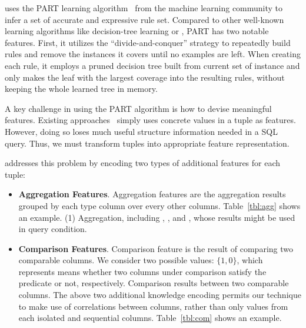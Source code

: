 \ourtool uses the PART learning algorithm~\cite{Frank:1998} from
the machine learning community to infer a set of accurate and
expressive rule set. Compared to other well-known learning algorithms
like decision-tree learning or , PART has two
notable features. 
First, it utilizes the ``divide-and-conquer'' strategy to repeatedly
build rules and remove the instances it covers until no examples are left.
When creating each rule, it employs a pruned decision tree built from
current set of instance and only makes the leaf with the largest coverage
into the resulting rules, without keeping the whole learned tree in memory.

A key challenge in using the PART algorithm is how to devise meaningful
features. Existing approaches~\cite{} simply uses concrete values in a tuple
as features. However, doing so loses much useful structure information
needed in a SQL query.
Thus, we must transform tuples into appropriate feature representation.

\ourtool addresses this problem by encoding two types of
additional features for each tuple:

\begin{itemize}

\item {\textbf{Aggregation Features}}. Aggregation
features are the aggregation results grouped by each  type column
over every other columns. Table~\ref{tbl:agg} shows an example.
(1) Aggregation, including , ,
 and , whose results might be used in query condition.


\item {\textbf{Comparison Features}}. Comparison
feature is the result of comparing two comparable columns. We
consider two possible values:  $\{1, 0\}$,  which represents
means whether two columns under comparison satisfy the predicate or not, respectively.
Comparison results between two comparable columns.
The above two additional knowledge encoding permits our technique
to make use of correlations between columns, rather than only values
from each isolated and sequential columns.
Table~\ref{tbl:com} shows an example.


\end{itemize}

\vspace{1mm}



